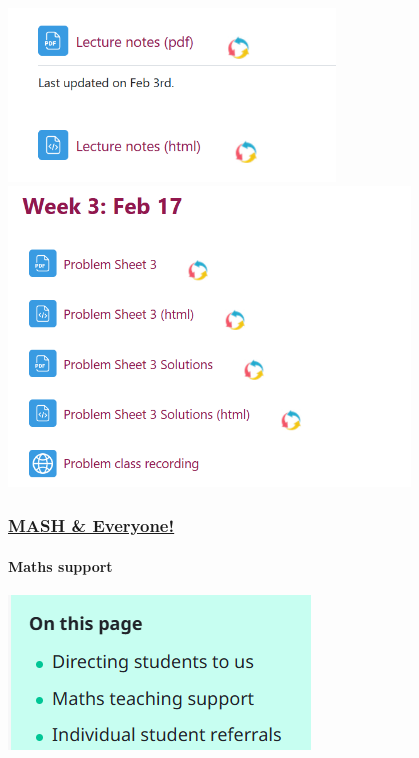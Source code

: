 \documentclass[
  letterpaper,
  DIV=11,
  numbers=noendperiod]{scrartcl}
\let\oldparagraph\paragraph
\renewcommand{\paragraph}[1]{\oldparagraph{#1}\mbox{}}
\begin{document}
\includegraphics[width=0.65\textwidth,height=\textheight]{./images/notes.png}\\
\includegraphics[width=0.8\textwidth,height=\textheight]{./images/sheets.png}\\

\subsubsection{\texorpdfstring{\href{./TEMSE-EHC-notes.html\#mash-everyone}{MASH
\& Everyone!}}{MASH \& Everyone!}}\label{mash-everyone}

\paragraph{Maths support}\label{maths-support}

\includegraphics{./images/MASH.png}\\
\end{document}
